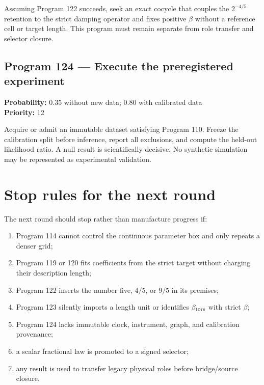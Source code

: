 \documentclass[11pt,a4paper,openany]{report}
\begin{document}
Assuming Program 122 succeeds, seek an exact cocycle that couples the \(2^{-4/5}\) retention to the strict damping operator and fixes positive \(\beta\) without a reference cell or target length. This program must remain separate from role transfer and selector closure.

\subsection{Program 124 --- Execute the preregistered experiment}

\textbf{Probability:} 0.35 without new data; 0.80 with calibrated data\\
\textbf{Priority:} 12

Acquire or admit an immutable dataset satisfying Program 110. Freeze the calibration split before inference, report all exclusions, and compute the held-out likelihood ratio. A null result is scientifically decisive. No synthetic simulation may be represented as experimental validation.

\section{Stop rules for the next round}

The next round should stop rather than manufacture progress if:

\begin{enumerate}
\item 
Program 114 cannot control the continuous parameter box and only repeats a denser grid;

\item 
Program 119 or 120 fits coefficients from the strict target without charging their description length;

\item 
Program 122 inserts the number five, \(4/5\), or \(9/5\) in its premises;

\item 
Program 123 silently imports a length unit or identifies \(\beta_{\rm tors}\) with strict \(\beta\);

\item 
Program 124 lacks immutable clock, instrument, graph, and calibration provenance;

\item 
a scalar fractional law is promoted to a signed selector;

\item 
any result is used to transfer legacy physical roles before bridge/\allowbreak{}source closure.

\end{enumerate}
\end{document}
